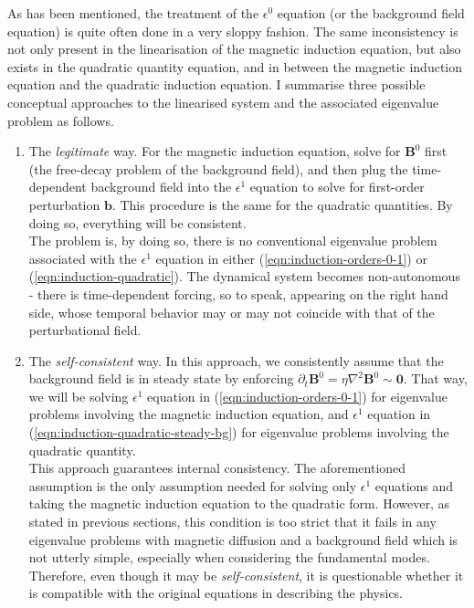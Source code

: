 As has been mentioned, the treatment of the $\epsilon^0$ equation (or the background field equation) is quite often done in a very sloppy fashion. The same inconsistency is not only present in the linearisation of the magnetic induction equation, but also exists in the quadratic quantity equation, and in between the magnetic induction equation and the quadratic induction equation.
I summarise three possible conceptual approaches to the linearised system and the associated eigenvalue problem as follows.
\begin{enumerate}
    \item The \textit{legitimate} way. For the magnetic induction equation, solve for $\mathbf{B}^0$ first (the free-decay problem of the background field), and then plug the time-dependent background field into the $\epsilon^1$ equation to solve for first-order perturbation $\mathbf{b}$. This procedure is the same for the quadratic quantities. By doing so, everything will be consistent. \\
    The problem is, by doing so, there is no conventional eigenvalue problem associated with the $\epsilon^1$ equation in either (\ref{eqn:induction-orders-0-1}) or (\ref{eqn:induction-quadratic}). The dynamical system becomes non-autonomous - there is time-dependent forcing, so to speak, appearing on the right hand side, whose temporal behavior may or may not coincide with that of the perturbational field.
    \item The \textit{self-consistent} way. In this approach, we consistently assume that the background field is in steady state by enforcing $\partial_t \mathbf{B}^0 = \eta \nabla^2 \mathbf{B}^0 \sim \mathbf{0}$. That way, we will be solving $\epsilon^1$ equation in (\ref{eqn:induction-orders-0-1}) for eigenvalue problems involving the magnetic induction equation, and $\epsilon^1$ equation in (\ref{eqn:induction-quadratic-steady-bg}) for eigenvalue problems involving the quadratic quantity. \\
    This approach guarantees internal consistency. The aforementioned assumption is the only assumption needed for solving only $\epsilon^1$ equations and taking the magnetic induction equation to the quadratic form. However, as stated in previous sections, this condition is too strict that it fails in any eigenvalue problems with magnetic diffusion and a background field which is not utterly simple, especially when considering the fundamental modes. Therefore, even though it may be \textit{self-consistent}, it is questionable whether it is compatible with the original equations in describing the physics.

\end{enumerate}
